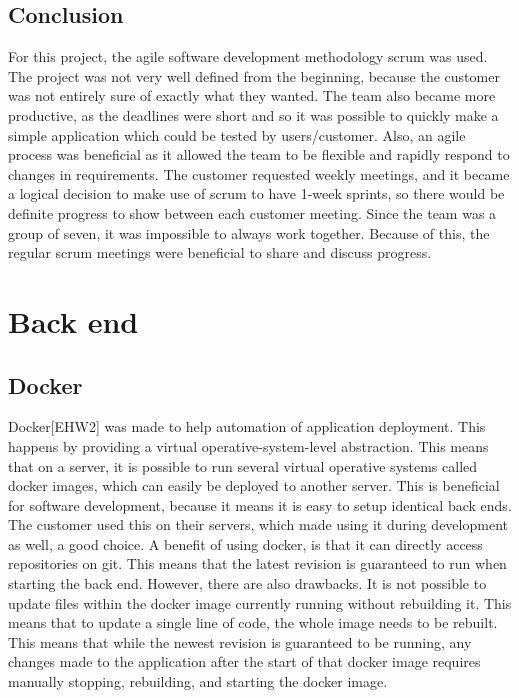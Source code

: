 \subsection{Conclusion}
For this project, the agile software development methodology scrum was used. The project was not very well defined from the beginning, because the customer was not entirely sure of exactly what they wanted. The team also became more productive, as the deadlines were short and so it was possible to quickly make a simple application which could be tested by users/customer. Also, an agile process was beneficial as it allowed the team to be flexible and rapidly respond to changes in requirements. The customer requested weekly meetings, and it became a logical decision to make use of scrum to have 1-week  sprints, so there would be definite progress to show between each customer meeting. Since the team was a group of seven, it was impossible to always work together. Because of this, the regular scrum meetings were beneficial to share and discuss progress.

\section{Back end}

\subsection{Docker}
\label{subsec_docker}

Docker[EHW2] was made to help automation of application deployment. This happens by providing a virtual operative-system-level abstraction. This means that on a server, it is possible to run several virtual operative systems called docker images, which can easily be deployed to another server. This is beneficial for software development, because it means it is easy to setup identical back ends. The customer used this on their servers, which made using it during development as well, a good choice. A benefit of using docker, is that it can directly access repositories on git. This means that the latest revision is guaranteed to run when starting the back end. However, there are also drawbacks. It is not possible to update files within the docker image currently running without rebuilding it. This means that to update a single line of code, the whole image needs to be rebuilt. This means that while the newest revision is guaranteed to be running, any changes made to the application after the start of that docker image requires manually stopping, rebuilding, and starting the docker image.


